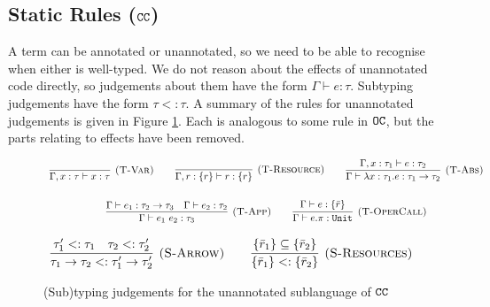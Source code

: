 \subsection{Static Rules ($\mathtt{CC}$)}

A term can be annotated or unannotated, so we need to be able to recognise when either is well-typed. We do not reason about the effects of unannotated code directly, so judgements about them have the form $\Gamma \vdash e: \tau$. Subtyping judgements have the form $\tau <: \tau$. A summary of the rules for unannotated judgements is given in Figure \ref{fig:unannotated_static_rules}. Each is analogous to some rule in $\mathtt{OC}$, but the parts relating to effects have been removed.

\begin{figure}[h]
\vspace{-5pt}



\[
\begin{array}{c}


\infer[\textsc{(T-Var)}]
	{\Gamma, x: \tau \vdash x: \tau}
	{}
\hspace{5ex}
\infer[\textsc{(T-Resource)}]
	{\Gamma, r: \{ r \} \vdash r : \{ r \}}
	{}

\hspace{5ex}
\infer[\textsc{(T-Abs)}]
	{\Gamma \vdash \lambda x: \tau_1.e : \tau_1 \rightarrow \tau_2}
	{\Gamma, x: \tau_1 \vdash e: \tau_2}\\[4ex]
	
\infer[\textsc{(T-App)}]
	{\Gamma \vdash e_1~e_2: \tau_3}
	{\Gamma \vdash e_1: \tau_2 \rightarrow \tau_3 & \Gamma \vdash e_2: \tau_2}
\hspace{5ex}
\infer[\textsc{(T-OperCall)}]
	{\Gamma \vdash e.\pi: \kwa{Unit}}
	{\Gamma \vdash e: \{ \bar r \}}

\end{array}
\]



\fbox{$\tau <: \tau$}

\[
\begin{array}{c}

\infer[\textsc{(S-Arrow)}]
	{ \tau_1 \rightarrow \tau_2 <: \tau_1' \rightarrow \tau_2' }
	{ \tau_1' <: \tau_1 & \tau_2 <: \tau_2' }
\hspace{5ex}
\infer[\textsc{(S-Resources)}]
	{ \{ \bar r_1 \} <: \{ \bar r_2 \} }
	{ \{ \bar r_1 \} \subseteq \{ \bar r_2 \} }

\end{array}
\]

\vspace{-7pt}
\caption{(Sub)typing judgements for the unannotated sublanguage of $\mathtt{CC}$}
\label{fig:unannotated_static_rules}
\end{figure}

